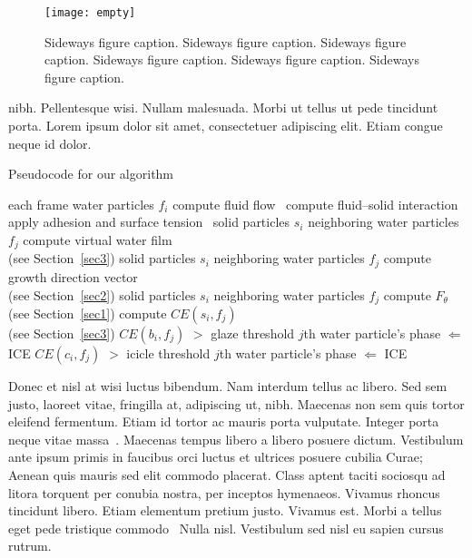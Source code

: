 \documentclass[AMS,STIX1COL]{WileyNJD-v2}
\begin{document}
\begin{sidewaysfigure}
\centerline{\texttt{[image: empty]}}
\caption{Sideways figure caption. Sideways figure caption. Sideways figure caption. Sideways figure caption. Sideways figure caption. Sideways figure caption.\label{fig3}}
\end{sidewaysfigure}

nibh. Pellentesque wisi. Nullam malesuada. Morbi ut tellus ut pede tincidunt porta. Lorem ipsum dolor sit amet,
consectetuer adipiscing elit. Etiam congue neque id dolor.

\begin{algorithm}
\caption{Pseudocode for our algorithm}\label{alg1}
\begin{algorithmic}
  \For each frame
  \For water particles $f_{i}$
  \State compute fluid flow~\cite{Rothermel1997}
  \State compute fluid--solid interaction~\cite{Allen2011}
  \State apply adhesion and surface tension~\cite{Ballen2011}
  \EndFor
   \For solid particles $s_{i}$
   \For neighboring water particles $f_{j}$
   \State compute virtual water film \\(see Section~\ref{sec3})
   \EndFor
   \EndFor
   \For solid particles $s_{i}$
   \For neighboring water particles $f_{j}$
   \State compute growth direction vector \\(see Section~\ref{sec2})
   \EndFor
   \EndFor
   \For solid particles $s_{i}$
   \For neighboring water particles $f_{j}$
   \State compute $F_{\theta}$ (see Section~\ref{sec1})
   \State compute $CE(s_{i},f_{j})$ \\(see Section~\ref{sec3})
   \If $CE(b_{i}, f_{j})$ $>$ glaze threshold
   \State $j$th water particle's phase $\Leftarrow$ ICE
   \EndIf
   \If $CE(c_{i}, f_{j})$ $>$ icicle threshold
   \State $j$th water particle's phase $\Leftarrow$ ICE
   \EndIf
   \EndFor
   \EndFor
  \EndFor
\end{algorithmic}
\end{algorithm}

Donec et nisl at wisi luctus bibendum. Nam interdum tellus ac libero. Sed sem justo, laoreet vitae, fringilla at,
adipiscing ut, nibh. Maecenas non sem quis tortor eleifend fermentum. Etiam id tortor ac mauris porta vulputate.
Integer porta neque vitae massa~\cite{Rothermel1997,Elbaum2002}. Maecenas tempus libero a libero posuere dictum. Vestibulum ante ipsum primis in
faucibus orci luctus et ultrices posuere cubilia Curae; Aenean quis mauris sed elit commodo placerat. Class aptent
taciti sociosqu ad litora torquent per conubia nostra, per inceptos hymenaeos. Vivamus rhoncus tincidunt libero.
Etiam elementum pretium justo. Vivamus est. Morbi a tellus eget pede tristique commodo~\cite{Elbaum2002} Nulla nisl. Vestibulum
sed nisl eu sapien cursus rutrum.
\end{document}
